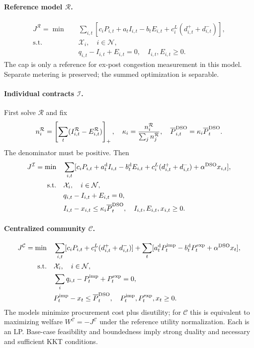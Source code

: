\paragraph{Reference model $\mathcal R$.}
\begin{align}
 J^{\mathcal R}=\min\quad&\sum_{i,t}
 [c_iP_{i,t}+a_tI_{i,t}-b_tE_{i,t}+c_i^L(d^+_{i,t}+d^-_{i,t})],\\
 \mathrm{s.t.}\quad&\mathcal X_i,\quad i\in\mathcal N,\\
 &q_{i,t}-I_{i,t}+E_{i,t}=0,\quad I_{i,t},E_{i,t}\ge0.
\end{align}
The cap is only a reference for ex-post congestion measurement in this model.
Separate metering is preserved; the summed optimization is separable.

\paragraph{Individual contracts $\mathcal I$.}
First solve $\mathcal R$ and fix
\begin{equation}
 n_i^{\mathcal R}=\left[\sum_t(I^{\mathcal R}_{i,t}-E^{\mathcal R}_{i,t})\right]_+,
 \quad \kappa_i=\frac{n_i^{\mathcal R}}{\sum_j n_j^{\mathcal R}},
 \quad \overline P^{\rm DSO}_{i,t}=\kappa_i\overline P_t^{\rm DSO}.
\end{equation}
The denominator must be positive. Then
\begin{align}
 J^{\mathcal I}=\min\quad&\sum_{i,t}[c_iP_{i,t}+a_t^{\rm d}I_{i,t}
 -b_t^{\rm d}E_{i,t}+c_i^L(d^+_{i,t}+d^-_{i,t})+\alpha^{\rm DSO}x_{i,t}],\\
 \mathrm{s.t.}\quad&\mathcal X_i,\quad i\in\mathcal N,\\
 &q_{i,t}-I_{i,t}+E_{i,t}=0,\\
 &I_{i,t}-x_{i,t}\le\kappa_i\overline P_t^{\rm DSO},
 \quad I_{i,t},E_{i,t},x_{i,t}\ge0.
\end{align}

\paragraph{Centralized community $\mathcal C$.}
\begin{align}
 J^{\mathcal C}=\min\quad&\sum_{i,t}[c_iP_{i,t}+c_i^L(d^+_{i,t}+d^-_{i,t})]
 +\sum_t[a_t^{\rm d}P_t^{\rm imp}-b_t^{\rm d}P_t^{\rm exp}+\alpha^{\rm DSO}x_t],\\
 \mathrm{s.t.}\quad&\mathcal X_i,\quad i\in\mathcal N,\\
 &\sum_i q_{i,t}-P_t^{\rm imp}+P_t^{\rm exp}=0,\\
 &P_t^{\rm imp}-x_t\le\overline P_t^{\rm DSO},
 \quad P_t^{\rm imp},P_t^{\rm exp},x_t\ge0.
\end{align}
The models minimize procurement cost plus disutility; for $\mathcal C$ this
is equivalent to maximizing welfare $W^{\mathcal C}=-J^{\mathcal C}$ under
the reference utility normalization. Each is an LP. Base-case feasibility
and boundedness imply strong duality and necessary and sufficient KKT conditions.
